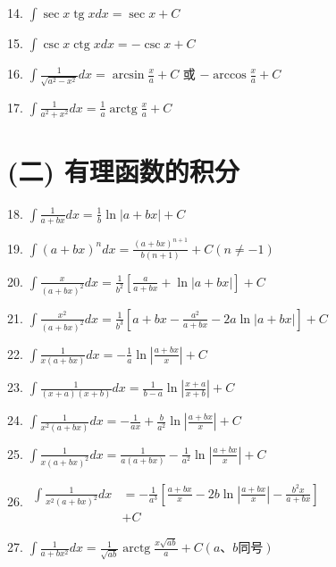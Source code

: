 \documentclass[lang=cn,newtx,12pt,scheme=chinese]{elegantbook}
\begin{document}
14. \(\int \sec x\operatorname{tg}{xdx} = \sec x + C\)

15. \(\int \csc x\operatorname{ctg}{xdx} = - \csc x + C\)

16. \(\int \frac{1}{\sqrt{{a}^{2} - {x}^{2}}}{dx} = \arcsin \frac{x}{a} + C\) 或 \(- \arccos \frac{x}{a} + C\)

17. \(\int \frac{1}{{a}^{2} + {x}^{2}}{dx} = \frac{1}{a}\operatorname{arctg}\frac{x}{a} + C\)

\section*{(二) 有理函数的积分}

18. \(\int \frac{1}{a + {bx}}{dx} = \frac{1}{b}\ln \left| {a + {bx}}\right| + C\)

19. \(\int {\left( a + bx\right) }^{n}{dx} = \frac{{\left( a + bx\right) }^{n + 1}}{b\left( {n + 1}\right) } + C\left( {n \neq - 1}\right)\)

20. \(\int \frac{x}{{\left( a + bx\right) }^{2}}{dx} = \frac{1}{{b}^{2}}\left\lbrack {\frac{a}{a + {bx}} + \ln \left| {a + {bx}}\right| }\right\rbrack + C\)

21. \(\int \frac{{x}^{2}}{{\left( a + bx\right) }^{2}}{dx} = \frac{1}{{b}^{3}}\left\lbrack {a + {bx} - \frac{{a}^{2}}{a + {bx}} - {2a}\ln \left| {a + {bx}}\right| }\right\rbrack + C\)

22. \(\int \frac{1}{x\left( {a + {bx}}\right) }{dx} = - \frac{1}{a}\ln \left| \frac{a + {bx}}{x}\right| + C\)

23. \(\int \frac{1}{\left( {x + a}\right) \left( {x + b}\right) }{dx} = \frac{1}{b - a}\ln \left| \frac{x + a}{x + b}\right| + C\)

24. \(\int \frac{1}{{x}^{2}\left( {a + {bx}}\right) }{dx} = - \frac{1}{ax} + \frac{b}{{a}^{2}}\ln \left| \frac{a + {bx}}{x}\right| + C\)

25. \(\int \frac{1}{x{\left( a + bx\right) }^{2}}{dx} = \frac{1}{a\left( {a + {bx}}\right) } - \frac{1}{{a}^{2}}\ln \left| \frac{a + {bx}}{x}\right| + C\)

26. \(\begin{aligned} \int \frac{1}{{x}^{2}{\left( a + bx\right) }^{2}}{dx} & = - \frac{1}{{a}^{3}}\left\lbrack {\frac{a + {bx}}{x} - {2b}\ln \left| \frac{a + {bx}}{x}\right| - \frac{{b}^{2}x}{a + {bx}}}\right\rbrack \\ & + C \end{aligned}\)

27. \(\int \frac{1}{a + b{x}^{2}}{dx} = \frac{1}{\sqrt{ab}}\operatorname{arctg}\frac{x\sqrt{ab}}{a} + C\left( {a\text{、}b\text{同号}}\right)\)
\end{document}
